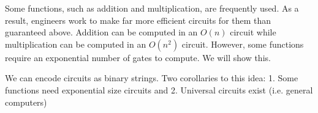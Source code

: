 \hr

Some functions, such as addition and multiplication, are frequently used. As a result, engineers work to make far more efficient circuits for them than guaranteed above. Addition can be computed in an $O(n)$ circuit while multiplication can be computed in an $O(n^2)$ circuit. However, some functions require an exponential number of gates to compute. We will show this.

\vspace{.5cm}

 We can encode circuits as binary strings. Two corollaries to this idea: 1. Some functions need exponential size circuits and 2. Universal circuits exist (i.e. general computers)


